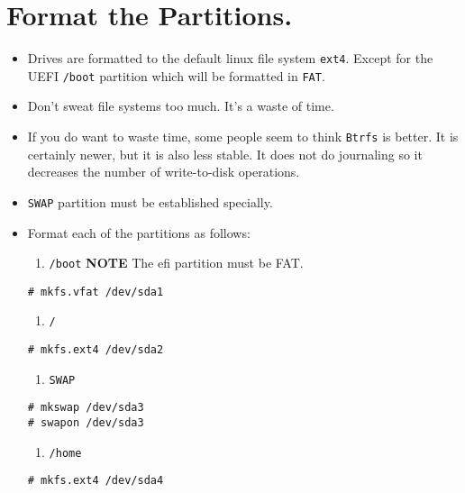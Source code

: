 \documentclass{article}
\begin{document}
\section{Format the Partitions.}
\begin{itemize}
  \item Drives are formatted to the default linux file system \verb|ext4|.
    Except for the UEFI \verb|/boot| partition which will be formatted in
    \verb|FAT|.
  \item Don't sweat file systems too much. It's a waste of time.
  \item If you do want to waste time, some people seem to think \verb|Btrfs|
    is better. It is certainly newer, but it is also less stable. It does not do
    journaling so it decreases the number of write-to-disk operations.
  \item \verb|SWAP| partition must be established specially.
  \item Format each of the partitions as follows:
  \begin{enumerate}
    \item \verb|/boot| \textbf{NOTE} The efi partition must be FAT.
  \end{enumerate}
\begin{verbatim}
# mkfs.vfat /dev/sda1
\end{verbatim}
  \begin{enumerate}
    \item \verb|/|
  \end{enumerate}
\begin{verbatim}
# mkfs.ext4 /dev/sda2
\end{verbatim}
  \begin{enumerate}
    \item \verb|SWAP|
  \end{enumerate}
\begin{verbatim}
# mkswap /dev/sda3
# swapon /dev/sda3
\end{verbatim}
  \begin{enumerate}
    \item \verb|/home|
  \end{enumerate}
\begin{verbatim}
# mkfs.ext4 /dev/sda4
\end{verbatim}
\end{itemize}
\end{document}
